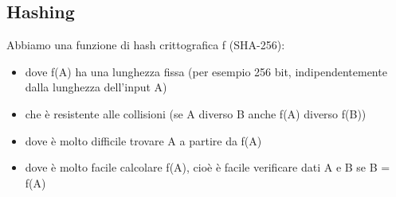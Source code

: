\subsection{Hashing}
Abbiamo una funzione di hash crittografica f (SHA-256):
\begin{itemize}
    \item dove f(A) ha una lunghezza fissa (per esempio 256 bit, indipendentemente dalla lunghezza dell'input A)
    \item che è resistente alle collisioni (se A diverso B anche f(A) diverso f(B)) 
    \item dove è molto difficile trovare A a partire da f(A)
    \item dove è molto facile calcolare f(A), cioè è facile verificare dati A e B se B = f(A)
\end{itemize}


